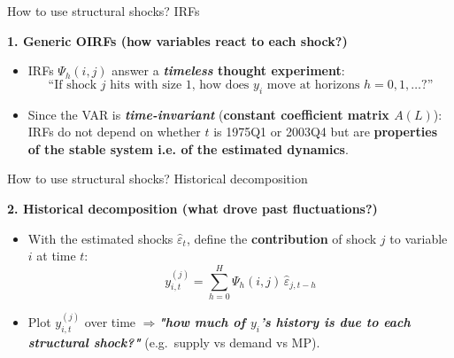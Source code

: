 \documentclass{beamer}
\begin{document}
\begin{frame}{How to use structural shocks? IRFs}

\textbf{1. Generic OIRFs (how variables react to each shock?)}
\begin{itemize}
\small
  \item IRFs $\Psi_h(i,j)$ answer a \textbf{\textit{timeless} thought experiment}:
  \[
  \text{“If shock $j$ hits with size 1, how does $y_i$ move at horizons $h=0,1,\dots$?”}
  \]
  \item Since the VAR is\textbf{ \emph{time-invariant}} (\textbf{constant coefficient matrix $A(L)$}): IRFs do not depend on
        whether $t$ is 1975Q1 or 2003Q4 but are \textbf{properties of the stable system i.e. of the estimated dynamics}.
\end{itemize}

\end{frame}



\begin{frame}{How to use structural shocks? Historical decomposition}

\textbf{2. Historical decomposition (what drove past fluctuations?)}
\begin{itemize}
  \item With the estimated shocks $\widehat{\varepsilon}_t$, define the \textbf{contribution} of shock $j$ to variable $i$ at time $t$:
  \[
    y_{i,t}^{(j)} 
    = \sum_{h=0}^{H} \Psi_h(i,j)\, \widehat{\varepsilon}_{j,t-h}
  \]
  \item Plot $y_{i,t}^{(j)}$ over time $\Rightarrow$\textit{\textbf{"how much of $y_i$’s history is due to each structural shock?"}} (e.g.\ supply vs demand vs MP).
\end{itemize}

\end{frame}
\end{document}
